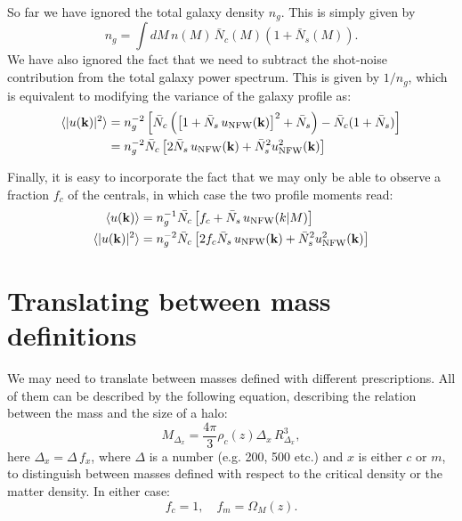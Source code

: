 \documentclass{article}
\begin{document}
    So far we have ignored the total galaxy density $n_g$. This is simply given by 
    \begin{equation}
      n_g=\int dM\,n(M)\,\bar{N}_c(M)\left(1+\bar{N}_s(M)\right).
    \end{equation}
    We have also ignored the fact that we need to subtract the shot-noise contribution from the total galaxy power spectrum. This is given by $1/n_g$, which is equivalent to modifying the variance of the galaxy profile as:
    \begin{align}
      \langle |u({\bf k})|^2\rangle
      &=n_g^{-2}\left[\bar{N}_c\left(\left[1+\bar{N}_s\,u_{\rm NFW}({\bf k})\right]^2+\bar{N}_s\right)-\bar{N}_c(1+\bar{N}_s)\right]\\
      &=n_g^{-2}\bar{N}_c\left[2\bar{N}_s\,u_{\rm NFW}({\bf k})+\bar{N}_s^2u_{\rm NFW}^2({\bf k})\right]
    \end{align}

    Finally, it is easy to incorporate the fact that we may only be able to observe a fraction $f_c$ of the centrals, in which case the two profile moments read:
    \begin{align}
      \langle u({\bf k})\rangle
      &=n_g^{-1}\bar{N_c}\left[f_c+\bar{N}_s\,u_{\rm NFW}(k|M)\right]\\
      \langle |u({\bf k})|^2\rangle
      &=n_g^{-2}\bar{N}_c\left[2f_c\bar{N}_s\,u_{\rm NFW}({\bf k})+\bar{N}_s^2u_{\rm NFW}^2({\bf k})\right]
    \end{align}

\section{Translating between mass definitions}\label{app:massdef}
  We may need to translate between masses defined with different prescriptions. All of them can be described by the following equation, describing the relation between the mass and the size of a halo:
  \begin{equation}
    M_{\Delta_x}=\frac{4\pi}{3}\rho_c(z)\Delta_x\,R_{\Delta_x}^3,
  \end{equation}
  here $\Delta_x=\Delta\,f_x$, where $\Delta$ is a number (e.g. 200, 500 etc.) and $x$ is either $c$ or $m$, to distinguish between masses defined with respect to the critical density or the matter density. In either case:
  \begin{equation}
    f_c=1,\hspace{12pt} f_m=\Omega_M(z).
  \end{equation}
\end{document}
